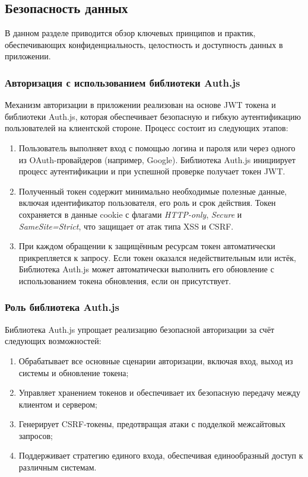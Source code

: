 \subsection{Безопасность данных}

В данном разделе приводится обзор ключевых принципов и практик, обеспечивающих конфиденциальность, целостность и доступность данных в приложении.

\subsubsection{Авторизация с использованием библиотеки Auth.js}
Механизм авторизации в приложении реализован на основе JWT токена и библиотеки Auth.js, которая обеспечивает безопасную и гибкую аутентификацию пользователей на клиентской стороне. Процесс состоит из следующих этапов:

\begin{enumerate}
  \item Пользователь выполняет вход с помощью логина и пароля или через одного из OAuth-провайдеров (например, Google). Библиотека Auth.js инициирует процесс аутентификации и при успешной проверке получает токен JWT.
  \item Полученный токен содержит минимально необходимые полезные данные, включая идентификатор пользователя, его роль и срок действия. Токен сохраняется в данные cookie с флагами \textit{HTTP-only}, \textit{Secure} и \textit{SameSite=Strict}, что защищает от атак типа XSS и CSRF.
  \item При каждом обращении к защищённым ресурсам токен автоматически прикрепляется к запросу. Если токен оказался недействительным или истёк, Библиотека Auth.js может автоматически выполнить его обновление с использованием токена обновления, если он присутствует.
\end{enumerate}

\subsubsection{Роль библиотека Auth.js}
Библиотека Auth.js упрощает реализацию безопасной авторизации за счёт следующих возможностей:

\begin{enumerate}
  \item Обрабатывает все основные сценарии авторизации, включая вход, выход из системы и обновление токена;
  \item Управляет хранением токенов и обеспечивает их безопасную передачу между клиентом и сервером;
  \item Генерирует CSRF-токены, предотвращая атаки с подделкой межсайтовых запросов;
  \item Поддерживает стратегию единого входа, обеспечивая единообразный доступ к различным системам.
\end{enumerate}

